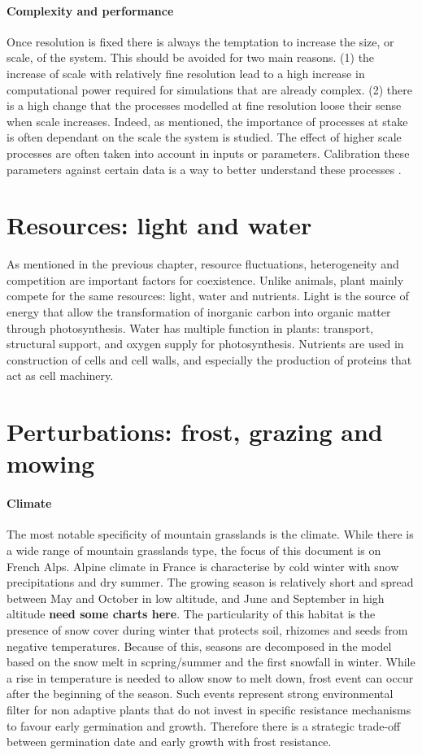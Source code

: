 \paragraph{Complexity and performance}
Once resolution is fixed there is always the temptation to increase the size, or scale, of the system. This should be avoided for two main reasons. (1) the increase of scale with relatively fine resolution lead to a high increase in computational power required for simulations that are already complex. (2) there is a high change that the processes modelled at fine resolution loose their sense when scale increases. Indeed, as mentioned, the importance of processes at stake is often dependant on the scale the system is studied. The effect of higher scale processes are often taken into account in inputs or parameters\cite{}. Calibration these parameters against certain data is a way to better understand these processes \cite{lagarigues}. 

\section{Resources: light and water}
As mentioned in the previous chapter, resource fluctuations, heterogeneity and competition are important factors for coexistence. Unlike animals, plant mainly compete for the same resources: light, water and nutrients. Light is the source of energy that allow the transformation of inorganic carbon into organic matter through photosynthesis. Water has multiple function in plants: transport, structural support, and oxygen supply for photosynthesis. Nutrients are used in construction of cells and cell walls, and especially the production of proteins that act as cell machinery.

\section{Perturbations: frost, grazing and mowing}
\paragraph{Climate}
The most notable specificity of mountain grasslands is the climate. While there is a wide range of mountain grasslands type, the focus of this document is on French Alps. Alpine climate in France is characterise by cold winter with snow precipitations and dry summer. The growing season is relatively short and spread between May and October in low altitude, and June and September in high altitude \textbf{need some charts here}. The particularity of this habitat is the presence of snow cover during winter that protects soil, rhizomes and seeds from negative temperatures. Because of this, seasons are decomposed in the model based on the snow melt in scpring/summer and the first snowfall in winter. While a rise in temperature is needed to allow snow to melt down, frost event can occur after the beginning of the season. Such events represent strong environmental filter for non adaptive plants that do not invest in specific resistance mechanisms to favour early germination and growth. Therefore there is a strategic trade-off between germination date and early growth with frost resistance.

